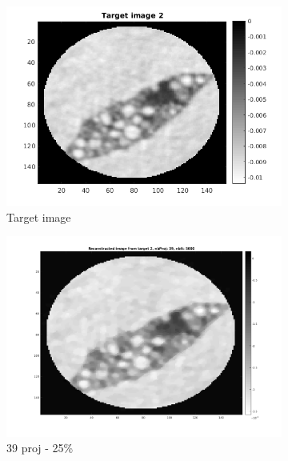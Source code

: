 \documentclass[10pt,a4paper,titlepage]{article}
\begin{document}
\begin{figure}[H]
        	
        	\begin{subfigure}[b]{0.32\textwidth}   
        	    \centering 
            	\includegraphics[width=\textwidth]{Sample2/target2.png}
            	\caption{Target image}
        	\end{subfigure}
        	\begin{subfigure}[b]{0.32\textwidth}   
        	    \centering 
        	    \includegraphics[width=\textwidth]{Sample2/L-D_5000/39_1_4.png}
        	    \caption{39 proj - 25\%}    
        	    \label{subfig:39p2L-D}
       		\end{subfigure}
        	\begin{subfigure}[b]{0.32\textwidth}  
            	\centering 

\end{subfigure}
\end{figure}
\end{document}
